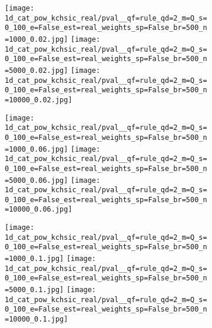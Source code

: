 \documentclass{article}%
\begin{document}
\normalsize


\begin{figure}[H]
\begin{subfigure}[t]{\linewidth}
\begin{subfigure}[H]{0.04\linewidth}
\hfill
\end{subfigure}
\begin{subfigure}[H]{0.32\linewidth}
\centering
{}
\end{subfigure}
\begin{subfigure}[H]{0.32\linewidth}
\centering
{}
\end{subfigure}
\begin{subfigure}[H]{0.32\linewidth}
\centering
{}
\end{subfigure}
\end{subfigure}
\begin{subfigure}[H]{\linewidth}
%
\texttt{[image: 1d\_cat\_pow\_kchsic\_real/pval\_\_qf=rule\_qd=2\_m=Q\_s=0\_100\_e=False\_est=real\_weights\_sp=False\_br=500\_n=1000\_0.02.jpg]}%
\texttt{[image: 1d\_cat\_pow\_kchsic\_real/pval\_\_qf=rule\_qd=2\_m=Q\_s=0\_100\_e=False\_est=real\_weights\_sp=False\_br=500\_n=5000\_0.02.jpg]}%
\texttt{[image: 1d\_cat\_pow\_kchsic\_real/pval\_\_qf=rule\_qd=2\_m=Q\_s=0\_100\_e=False\_est=real\_weights\_sp=False\_br=500\_n=10000\_0.02.jpg]}%

\end{subfigure}
\begin{subfigure}[H]{\linewidth}
%
\texttt{[image: 1d\_cat\_pow\_kchsic\_real/pval\_\_qf=rule\_qd=2\_m=Q\_s=0\_100\_e=False\_est=real\_weights\_sp=False\_br=500\_n=1000\_0.06.jpg]}%
\texttt{[image: 1d\_cat\_pow\_kchsic\_real/pval\_\_qf=rule\_qd=2\_m=Q\_s=0\_100\_e=False\_est=real\_weights\_sp=False\_br=500\_n=5000\_0.06.jpg]}%
\texttt{[image: 1d\_cat\_pow\_kchsic\_real/pval\_\_qf=rule\_qd=2\_m=Q\_s=0\_100\_e=False\_est=real\_weights\_sp=False\_br=500\_n=10000\_0.06.jpg]}%

\end{subfigure}
\begin{subfigure}[H]{\linewidth}
%
\texttt{[image: 1d\_cat\_pow\_kchsic\_real/pval\_\_qf=rule\_qd=2\_m=Q\_s=0\_100\_e=False\_est=real\_weights\_sp=False\_br=500\_n=1000\_0.1.jpg]}%
\texttt{[image: 1d\_cat\_pow\_kchsic\_real/pval\_\_qf=rule\_qd=2\_m=Q\_s=0\_100\_e=False\_est=real\_weights\_sp=False\_br=500\_n=5000\_0.1.jpg]}%
\texttt{[image: 1d\_cat\_pow\_kchsic\_real/pval\_\_qf=rule\_qd=2\_m=Q\_s=0\_100\_e=False\_est=real\_weights\_sp=False\_br=500\_n=10000\_0.1.jpg]}%

\end{subfigure}
\end{figure}
\end{document}
